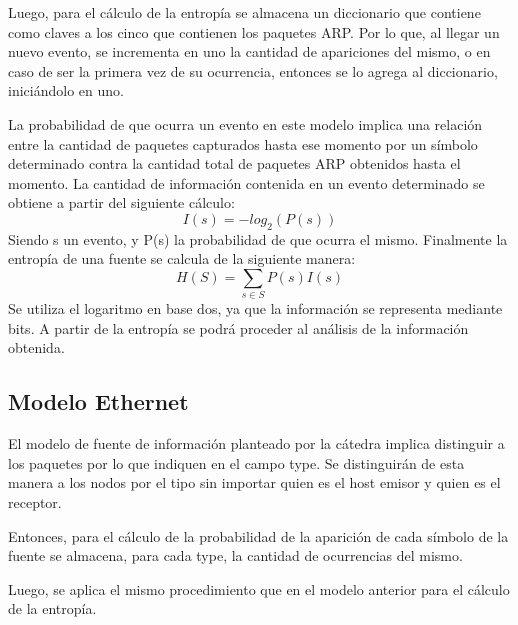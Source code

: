 Luego, para el cálculo de la entropía se almacena un diccionario que contiene como claves a los cinco que contienen los paquetes ARP. Por lo que, al llegar un nuevo evento, se incrementa en uno la cantidad de apariciones del mismo, o en caso de ser la primera vez de su ocurrencia, entonces se lo agrega al diccionario, iniciándolo en uno.

La probabilidad de que ocurra un evento en este modelo implica una relación entre la cantidad de paquetes capturados hasta ese momento por un símbolo determinado contra la cantidad total de paquetes ARP obtenidos hasta el momento. 
La cantidad de información contenida en un evento determinado se obtiene a partir del siguiente cálculo: 
\begin{equation}
 I(s) = -log_{2}(P(s))
\end{equation}
Siendo s un evento, y P(s) la probabilidad de que ocurra el mismo. 
Finalmente la entropía de una fuente se calcula de la siguiente manera: 
\begin{equation}
 H(S) = \sum_{s \in S} P(s) I(s)
\end{equation}
Se utiliza el logaritmo en base dos, ya que la información se representa mediante bits. A partir de la entropía se podrá proceder al análisis de la información obtenida.


\subsection{Modelo Ethernet}
El modelo de fuente de información planteado por la cátedra implica distinguir a los paquetes por lo que indiquen en el campo type. Se distinguirán de esta manera a los nodos por el tipo sin importar quien es el host emisor y quien es el receptor. 

Entonces, para el cálculo de la probabilidad de la aparición de cada símbolo de la fuente se almacena, para cada type, la cantidad de ocurrencias del mismo.

Luego, se aplica el mismo procedimiento que en el modelo anterior para el cálculo de la entropía.